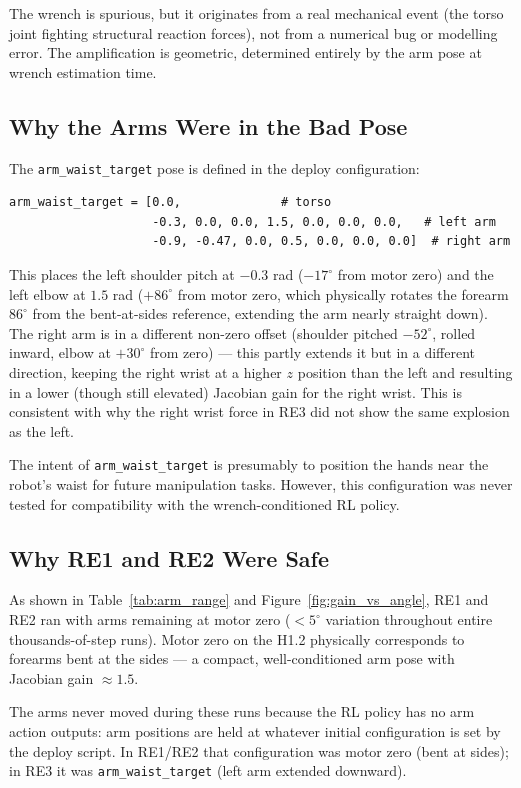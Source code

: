 \documentclass[11pt,a4paper]{article}
\begin{document}
\noindent The wrench is spurious, but it originates from a real mechanical
event (the torso joint fighting structural reaction forces), not from a
numerical bug or modelling error.  The amplification is geometric,
determined entirely by the arm pose at wrench estimation time.

\subsection{Why the Arms Were in the Bad Pose}

The \texttt{arm\_waist\_target} pose is defined in the deploy configuration:
\begin{lstlisting}
arm_waist_target = [0.0,              # torso
                    -0.3, 0.0, 0.0, 1.5, 0.0, 0.0, 0.0,   # left arm
                    -0.9, -0.47, 0.0, 0.5, 0.0, 0.0, 0.0]  # right arm
\end{lstlisting}
This places the left shoulder pitch at $-0.3$ rad ($-17^\circ$ from motor
zero) and the left elbow at $1.5$ rad ($+86^\circ$ from motor zero, which
physically rotates the forearm $86^\circ$ from the bent-at-sides reference,
extending the arm nearly straight down).  The right arm is in a different
non-zero offset (shoulder pitched $-52^\circ$, rolled inward, elbow at
$+30^\circ$ from zero) --- this partly extends it but in a different
direction, keeping the right wrist at a higher $z$ position than the left
and resulting in a lower (though still elevated) Jacobian gain for the right
wrist.  This is consistent with why the right wrist force in RE3 did not
show the same explosion as the left.

The intent of \texttt{arm\_waist\_target} is presumably to position the
hands near the robot's waist for future manipulation tasks.  However, this
configuration was never tested for compatibility with the
wrench-conditioned RL policy.

\subsection{Why RE1 and RE2 Were Safe}

As shown in Table~\ref{tab:arm_range} and Figure~\ref{fig:gain_vs_angle},
RE1 and RE2 ran with arms remaining at motor zero ($<5^\circ$ variation
throughout entire thousands-of-step runs).  Motor zero on the H1.2
physically corresponds to forearms bent at the sides --- a compact,
well-conditioned arm pose with Jacobian gain $\approx 1.5$.

The arms never moved during these runs because the RL policy has no arm
action outputs: arm positions are held at whatever initial configuration
is set by the deploy script.  In RE1/RE2 that configuration was motor zero
(bent at sides); in RE3 it was \texttt{arm\_waist\_target} (left arm
extended downward).
\end{document}
